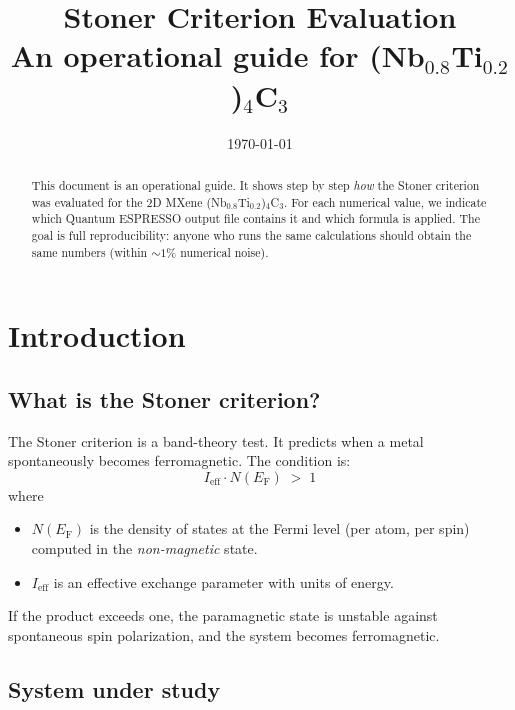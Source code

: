 \documentclass[11pt,a4paper]{article}
\title{\bfseries
    Stoner Criterion Evaluation\\
    \large An operational guide for (Nb$_{0.8}$Ti$_{0.2}$)$_4$C$_3$
}
\author{}
\date{\today}
\newcommand{\Ef}{E_{\mathrm{F}}}
\newcommand{\Ieff}{I_{\text{eff}}}
\newcommand{\NEf}{N(\Ef)}
\begin{document}
\maketitle

\begin{abstract}
\noindent
This document is an operational guide. It shows step by step \emph{how}
the Stoner criterion was evaluated for the 2D MXene
(Nb$_{0.8}$Ti$_{0.2}$)$_4$C$_3$. For each numerical value, we indicate
which Quantum ESPRESSO output file contains it and which formula is
applied. The goal is full reproducibility: anyone who runs the same
calculations should obtain the same numbers (within $\sim 1\%$
numerical noise).
\end{abstract}

\section{Introduction}

\subsection{What is the Stoner criterion?}

The Stoner criterion is a band-theory test. It predicts when a metal
spontaneously becomes ferromagnetic. The condition is:
%
\begin{equation}
    \boxed{\,\Ieff \cdot \NEf \;>\; 1\,}
    \label{eq:stoner}
\end{equation}
%
where
\begin{itemize}[itemsep=2pt]
    \item $\NEf$ is the density of states at the Fermi level (per atom,
          per spin) computed in the \emph{non-magnetic} state.
    \item $\Ieff$ is an effective exchange parameter with units of energy.
\end{itemize}

If the product exceeds one, the paramagnetic state is unstable against
spontaneous spin polarization, and the system becomes ferromagnetic.

\subsection{System under study}
\end{document}
